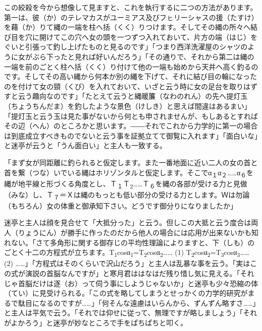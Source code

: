 \documentclass{book}
\begin{document}
この絞殺を今から想像して見ますと、これを執行するに二つの方法があります。第一は、彼（か）のテレマカスがユーミアス及びフㇶリーシャスの援（たすけ）を藉（か）りて縄の一端を柱へ括（くく）りつけます。そしてその縄の所々へ結び目を穴に開けてこの穴へ女の頭を一つずつ入れておいて、片方の端（はじ）をぐいと引張って釣し上げたものと見るのです」「つまり西洋洗濯屋のシャツのように女がぶら下ったと見れば好いんだろう」「その通りで、それから第二は縄の一端を前のごとく柱へ括（くく）り付けて他の一端も始めから天井へ高く釣るのです。そしてその高い縄から何本か別の縄を下げて、それに結び目の輪になったのを付けて女の頸（くび）を入れておいて、いざと云う時に女の足台を取りはずすと云う趣向なのです」「たとえて云うと縄暖簾（なわのれん）の先へ提灯玉（ちょうちんだま）を釣したような景色（けしき）と思えば間違はあるまい」「提灯玉と云う玉は見た事がないから何とも申されませんが、もしあるとすればその辺（へん）のところかと思います。――それでこれから力学的に第一の場合は到底成立すべきものでないと云う事を証拠立てて御覧に入れます」「面白いな」と迷亭が云うと「うん面白い」と主人も一致する。

「まず女が同距離に釣られると仮定します。また一番地面に近い二人の女の首と首を繋（つな）いでいる縄はホリゾンタルと仮定します。そこでα\textsubscript{１}α\textsubscript{２}\ldots{}\ldots{}α\textsubscript{６}を縄が地平線と形づくる角度とし、Ｔ\textsubscript{１}Ｔ\textsubscript{2}\ldots{}\ldots{}Ｔ\textsubscript{６}を縄の各部が受ける力と見做（みな）し、Ｔ\textsubscript{７}＝Ｘは縄のもっとも低い部分の受ける力とします。Ｗは勿論（もちろん）女の体重と御承知下さい。どうです御分りになりましたか」

迷亭と主人は顔を見合せて「大抵分った」と云う。但しこの大抵と云う度合は両人（りょうにん）が勝手に作ったのだから他人の場合には応用が出来ないかも知れない。「さて多角形に関する御存じの平均性理論によりますと、下（しも）のごとく十二の方程式が立ちます。T\textsubscript{1}cosα\textsubscript{1}=T\textsubscript{2}cosα\textsubscript{2}\ldots{}\ldots{} (1) T\textsubscript{2}cosα\textsubscript{2}=T\textsubscript{3}cosα\textsubscript{3}\ldots{}\ldots{} (2) \ldots{}\ldots{}」「方程式はそのくらいで沢山だろう」と主人は乱暴な事を云う。「実はこの式が演説の首脳なんですが」と寒月君ははなはだ残り惜し気に見える。「それじゃ首脳だけは逐（お）って伺う事にしようじゃないか」と迷亭も少々恐縮の体（てい）に見受けられる。「この式を略してしまうとせっかくの力学的研究がまるで駄目になるのですが\ldots{}\ldots{}」「何そんな遠慮はいらんから、ずんずん略すさ\ldots{}\ldots{}」と主人は平気で云う。「それでは仰せに従って、無理ですが略しましょう」「それがよかろう」と迷亭が妙なところで手をぱちぱちと叩く。
\end{document}
